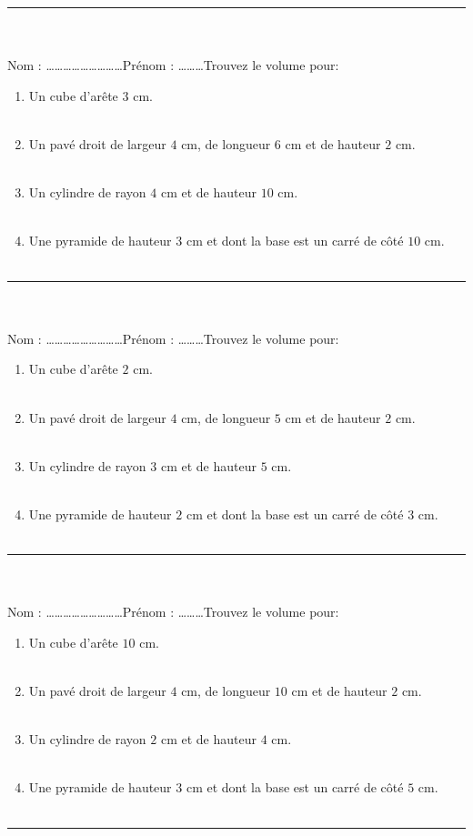 \documentclass[14 pt]{extarticle}
\theoremstyle{plain}
\begin{document}
 \hrule
 \ \\ \ \\
 Nom : \ldots\ldots\ldots\ldots\ldots\ldots\ldots\ldots\ldots Prénom : \ldots\ldots\ldots  Trouvez le volume pour:\begin{enumerate}
\item Un cube d'arête $3$ cm. 
\\ \ 
\item Un pavé droit de largeur $4$ cm, de longueur $6$ cm et de hauteur $2$ cm. 
\\ \ 
\item Un cylindre de rayon $4$ cm et de hauteur $10$ cm. 
\\ \ 
\item Une pyramide de hauteur $3$ cm et dont la base est un carré de côté $10$ cm. 
\\ \ 

\end{enumerate}
 \hrule
 \ \\ \ \\
 Nom : \ldots\ldots\ldots\ldots\ldots\ldots\ldots\ldots\ldots Prénom : \ldots\ldots\ldots  Trouvez le volume pour: \begin{enumerate}
\item Un cube d'arête $2$ cm. 
\\ \ 
\item Un pavé droit de largeur $4$ cm, de longueur $5$ cm et de hauteur $2$ cm. 
\\ \ 
\item Un cylindre de rayon $3$ cm et de hauteur $5$ cm. 
\\ \ 
\item Une pyramide de hauteur $2$ cm et dont la base est un carré de côté $3$ cm. 
\\ \ 

\end{enumerate}
 \hrule
 \ \\ \ \\
 Nom : \ldots\ldots\ldots\ldots\ldots\ldots\ldots\ldots\ldots Prénom : \ldots\ldots\ldots Trouvez le volume pour: \begin{enumerate}
\item Un cube d'arête $10$ cm. 
\\ \ 
\item Un pavé droit de largeur $4$ cm, de longueur $10$ cm et de hauteur $2$ cm. 
\\ \ 
\item Un cylindre de rayon $2$ cm et de hauteur $4$ cm. 
\\ \ 
\item Une pyramide de hauteur $3$ cm et dont la base est un carré de côté $5$ cm. 
\\ \ 

\end{enumerate}
 \hrule
 
 
 
 	
\end{document}
